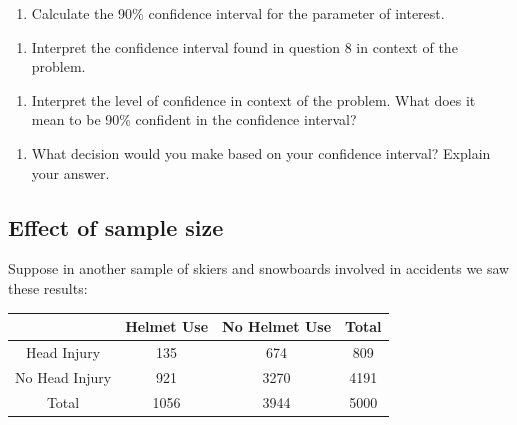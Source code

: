 \documentclass[
]{report}
\providecommand{\tightlist}{%
  \setlength{\itemsep}{0pt}\setlength{\parskip}{0pt}}
\begin{document}
\begin{enumerate}
\def\labelenumi{\arabic{enumi}.}
\setcounter{enumi}{7}
\tightlist
\item
  Calculate the 90\% confidence interval for the parameter of interest.
\end{enumerate}

\vspace{0.8in}

\begin{enumerate}
\def\labelenumi{\arabic{enumi}.}
\setcounter{enumi}{8}
\tightlist
\item
  Interpret the confidence interval found in question 8 in context of the problem.
\end{enumerate}

\vspace{0.8in}

\begin{enumerate}
\def\labelenumi{\arabic{enumi}.}
\setcounter{enumi}{9}
\tightlist
\item
  Interpret the level of confidence in context of the problem. What does it mean to be 90\% confident in the confidence interval?
\end{enumerate}

\vspace{0.8in}

\begin{enumerate}
\def\labelenumi{\arabic{enumi}.}
\setcounter{enumi}{10}
\tightlist
\item
  What decision would you make based on your confidence interval? Explain your answer.
  \vspace{0.5in}
\end{enumerate}

\hypertarget{effect-of-sample-size-2}{%
\subsection{Effect of sample size}\label{effect-of-sample-size-2}}

Suppose in another sample of skiers and snowboards involved in accidents we saw these results:

\begin{longtable}[]{@{}cccc@{}}
\toprule
& Helmet Use & No Helmet Use & Total \\
\midrule
\endhead
Head Injury & 135 & 674 & 809 \\
No Head Injury & 921 & 3270 & 4191 \\
Total & 1056 & 3944 & 5000 \\
\bottomrule
\end{longtable}
\end{document}
